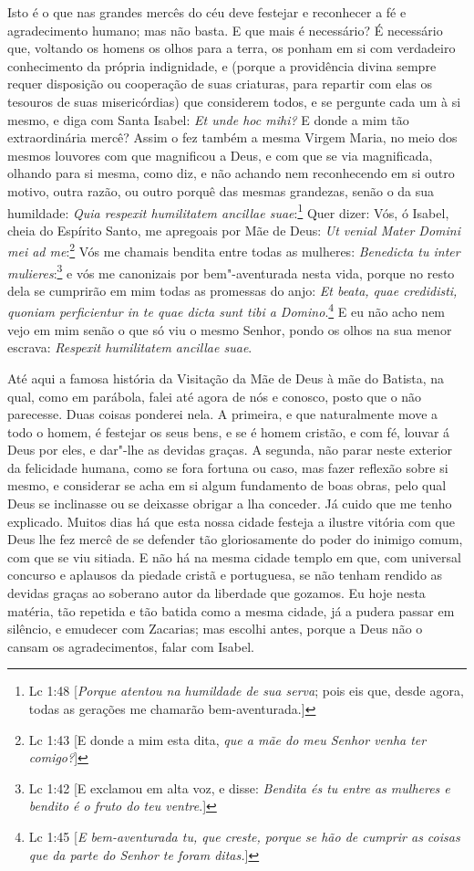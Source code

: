 Isto é o que nas grandes mercês do céu deve festejar e reconhecer a fé e
agradecimento humano; mas não basta. E que mais é necessário? É
necessário que, voltando os homens os olhos para a terra, os ponham em
si com verdadeiro conhecimento da própria indignidade, e (porque a
providência divina sempre requer disposição ou cooperação de suas
criaturas, para repartir com elas os tesouros de suas misericórdias)
que considerem todos, e se pergunte cada um à si mesmo, e diga com Santa
Isabel: \emph{Et unde hoc mihi?} E donde a mim tão extraordinária mercê?
Assim o fez também a mesma Virgem Maria, no meio dos mesmos louvores
com que magnificou a Deus, e com que se via magnificada, olhando para si
mesma, como diz, e não achando nem reconhecendo em si outro motivo, outra razão, ou
outro porquê das mesmas grandezas, senão o da sua humildade: \emph{Quia
respexit humilitatem ancillae suae}:\footnote{Lc 1:48 [\textit{Porque atentou na humildade de sua serva}; pois eis que, desde agora, todas as gerações me chamarão bem-aventurada.]} Quer dizer: Vós, ó Isabel,
cheia do Espírito Santo, me apregoais por Mãe de Deus: \emph{Ut venial
Mater Domini mei ad me}:\footnote{Lc 1:43 [E donde a mim esta dita, \textit{que a mãe do meu Senhor venha ter comigo?}]} Vós me chamais bendita entre todas as
mulheres: \emph{Benedicta tu inter mulieres}:\footnote{Lc 1:42 [E exclamou em alta voz, e disse: \textit{Bendita és tu entre as mulheres e bendito é o fruto do teu ventre}.]} e vós me
canonizais por bem"-aventurada nesta vida, porque no resto dela se
cumprirão em mim todas as promessas do anjo: \emph{Et beata, quae
credidisti, quoniam perficientur in te quae dicta sunt tibi a
Domino}.\footnote{Lc 1:45 [\textit{E bem-aventurada tu, que creste, porque se hão de cumprir as coisas que da parte do Senhor te foram ditas.}]} E eu não acho nem vejo em mim senão o que só viu o mesmo
Senhor, pondo os olhos na sua menor escrava: \emph{Respexit humilitatem
ancillae suae}.

Até aqui a famosa história da Visitação da Mãe de Deus à mãe do Batista,
na qual, como em parábola, falei até agora de nós e conosco, posto que o
não parecesse. Duas coisas ponderei nela. A primeira, e que naturalmente
move a todo o homem, é
festejar os seus bens, e se é homem cristão, e com fé, louvar á Deus por
eles, e dar"-lhe as devidas graças. A segunda, não parar neste exterior
da felicidade humana, como se fora fortuna ou caso, mas fazer reflexão
sobre si mesmo, e considerar se acha em si algum fundamento de boas
obras, pelo qual Deus se inclinasse ou se deixasse obrigar a lha
conceder. Já cuido que me tenho explicado. Muitos dias há que esta nossa
cidade festeja a ilustre vitória com que Deus lhe fez mercê de se
defender tão gloriosamente do poder do inimigo comum, com que se viu
sitiada. E não há na mesma cidade templo em que, com universal concurso
e aplausos da piedade cristã e portuguesa, se não tenham rendido as
devidas graças ao soberano autor da liberdade que gozamos. Eu hoje nesta
matéria, tão repetida e tão batida como a mesma cidade, já a pudera
passar em silêncio, e emudecer com Zacarias; mas escolhi antes, porque
a Deus não o cansam os agradecimentos, falar com Isabel.

